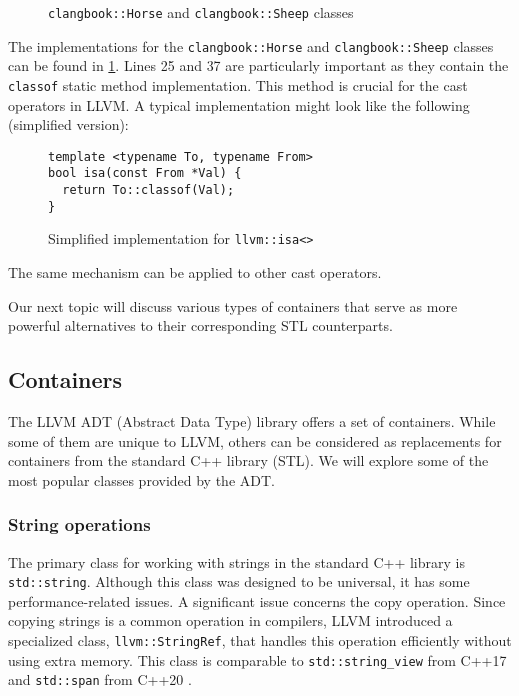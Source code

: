 \begin{figure}[H]
\inputminted[highlightlines={25,37},
  firstline=21,lastline=43]{c++}{src/part1/ch4_baselibs/baselibs/TestCast.h}
\caption{\texttt{clangbook::Horse} and \texttt{clangbook::Sheep} classes}
\label{lis:ch4:animal:horse_sheep}
\end{figure}
The implementations for the \texttt{clangbook::Horse} and
\texttt{clangbook::Sheep} classes can be found in
\cref{lis:ch4:animal:horse_sheep}. Lines 25 and 37 are particularly important as
they contain the \texttt{classof} static method implementation. This
method is crucial for the cast operators in LLVM. A typical implementation might
look like the following (simplified version):
\begin{figure}[H]
\begin{verbatim}
template <typename To, typename From>
bool isa(const From *Val) {
  return To::classof(Val);
}
\end{verbatim}
\caption{Simplified implementation for \texttt{llvm::isa<>}}
\label{lis:ch4:isa_simplified}
\end{figure}
The same mechanism can be applied to other cast operators.

Our next topic will discuss various types of containers that serve as more
powerful alternatives to their corresponding STL counterparts. 

\subsection{Containers}
The LLVM ADT (Abstract Data Type) library offers a set of containers. While some
of them are unique to LLVM, others can be considered as replacements for
containers from the standard C++ library (STL). We will explore some of the most
popular classes provided by the ADT.

\subsubsection{String operations}
\label{sec:ch4:string_operations}
The primary class for working with strings in the standard C++ library is
\texttt{std::string}. Although this class was designed to be universal,
it has some performance-related issues. A significant issue concerns the copy
operation. Since copying strings is a common operation in compilers, LLVM
introduced a specialized class, \texttt{llvm::StringRef}, that handles
this operation efficiently without using extra memory. This class is comparable
to \texttt{std::string_view} from C++17 \citep{standard:cpp17} and
\texttt{std::span} from C++20 \citep{standard:cpp20}. 

